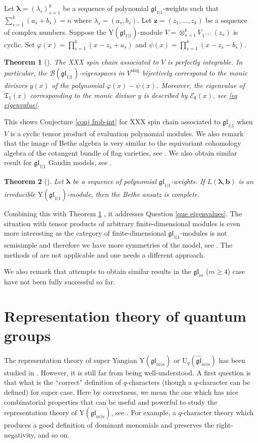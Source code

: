 \documentclass[11pt,reqno]{amsart}
\numberwithin{equation}{section}
\newtheorem{thm}{Theorem}[section]
\theoremstyle{definition}
\theoremstyle{remark}
\newcommand{\mc}{\mathcal}
\newcommand{\gl}{\mathfrak{gl}}
\newcommand{\fkT}{\mathfrak{T}}
\newcommand{\sing}{{\mathrm{sing}}}
\newcommand{\gge}{\geqslant}
\newcommand{\la}{\lambda}
\newcommand{\bla}{\bm\lambda}
\newcommand{\YglMN}{\mathrm{Y}(\mathfrak{gl}_{m|n})}
\newcommand{\Yone}{\mathrm{Y}(\mathfrak{gl}_{1|1})}
\begin{document}
Let $\bla=(\la_s)_{s=1}^k$ be a sequence of polynomial $\gl_{1|1}$-weights such that $\sum_{s=1}^k(a_s+b_s)=n$ where $\la_s=(a_s,b_s)$. Let $\bm z=(z_1,\dots,z_k)$ be a sequence of complex numbers. Suppose the $\Yone$-module $V=\otimes_{s=1}^k V_{\la^{(s)}}(z_s)$ is cyclic. Set $\varphi(x)=\prod_{s=1}^k(x-z_s+a_s)$ and $\psi(x)=\prod_{s=1}^k(x-z_s-b_s)$.

\begin{thm}[{\cite[Theorem 4.9]{LM:2019}}]\label{thm tensor irr}
The XXX spin chain associated to $V$ is perfectly integrable. In particular, the $\mc B(\gl_{1|1})$-eigenspaces in $V^\sing$ bijectively correspond to the monic divisors $y(x)$ of the polynomial $\varphi(x)-\psi(x)$. Moreover, the eigenvalue of $\fkT_1(x)$ corresponding to the monic divisor $y$ is described by $\mc E_{\bm t}(x)$, see \eqref{eq eigenvalue}.
\end{thm}

This shows Conjecture \ref{conj frob-int} for XXX spin chain associated to $\gl_{1|1}$ when $V$ is a cyclic tensor product of evaluation polynomial modules. We also remark that the image of Bethe algebra is very similar to the equivariant cohomology algebra of the cotangent bundle of flag varieties, see \cite[equation (5.1)]{GRTV:2012}. We also obtain similar result for $\gl_{1|1}$ Gaudin models, see \cite{L:2022}.

\begin{thm}[{\cite[Theorem 2.11]{LM:2019}}]
Let $\bla$ be a sequence of polynomial $\gl_{1|1}$-weights. If $L(\bla,\bm b)$ is an irreducible $\Yone$-module, then the Bethe ansatz is complete.
\end{thm}

Combining this with Theorem \ref{thm tensor irr}
, it addresses Question \ref{que eigenvalues}. The situation with tensor products of arbitrary finite-dimensional modules is even more interesting as the category of finite-dimensional $\gl_{1|1}$-modules is not semisimple and therefore we have more symmetries of the model, see \cite[Section 8.3]{HMVY:2019}. The methods of \cite{LM:2019} are not applicable and one needs a different approach.

We also remark that attempts to obtain similar results in the $\gl_m$ ($m\gge 4$) case have not been fully successful so far.

\section{Representation theory of quantum groups}
The representation theory of super Yangian $\YglMN$ or $\mathrm{U}_q(\widehat{\mathfrak{gl}}_{m|n})$ has been studied in \cite{Zh:1995,Zh:1996,Zhh:2014,Zhh:2017,Zhh:2018}. However, it is still far from being well-understood. A first question is that what is the ``correct" definition of $q$-characters (though a $q$-character can be defined) for super case. Here by correctness, we mean the one which has nice combinatorial properties that can be useful and powerful to study the representation theory of $\YglMN$, see \cite{FM:2001}. For example, a $q$-character theory which produces a good definition of dominant monomials and preserves the right-negativity, and so on.
\end{document}
